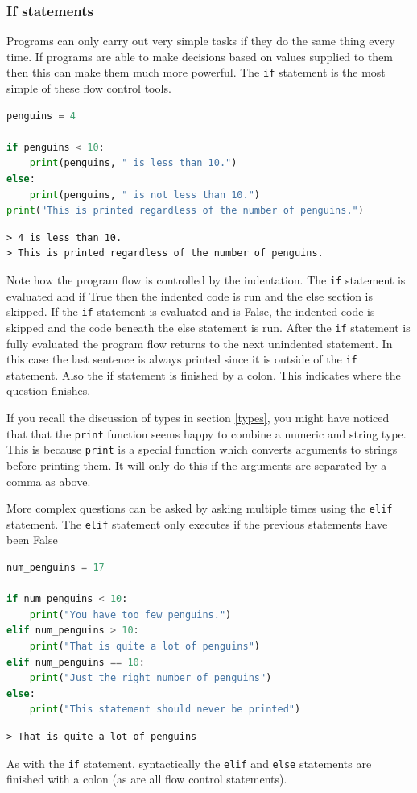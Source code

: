 		\subsubsection{If statements}
		Programs can only carry out very simple tasks if they do the same thing every time. If programs are able to make decisions based on values supplied to them then this can make them much more powerful. The \texttt{if} statement is the most simple of these flow control tools.
		
		\begin{lstlisting}[language=Python]
penguins = 4

if penguins < 10:
	print(penguins, " is less than 10.")
else:
	print(penguins, " is not less than 10.")
print("This is printed regardless of the number of penguins.")\end{lstlisting}
		\begin{verbatim}
> 4 is less than 10.
> This is printed regardless of the number of penguins.\end{verbatim}	
		Note how the program flow is controlled by the indentation. The \texttt{if} statement  is evaluated and if True then the indented code is run and the else section is skipped. If the \texttt{if} statement  is evaluated and is False, the indented code is skipped and the code beneath the else statement is run. After the \texttt{if}  statement is fully evaluated the program flow returns to the next unindented statement. In this case the last sentence is always printed since it is outside of the \texttt{if} statement. Also the if statement is finished by a colon. This indicates where the question finishes.
		
		If you recall the discussion of types in section \ref{types}, you might have noticed that that the \texttt{print} function seems happy to combine a numeric and string type. This is because \texttt{print} is a special function which converts arguments to strings before printing them. It will only do this if the arguments are separated by a comma as above.
		
		More complex questions can be asked by asking multiple times using the \texttt{elif} statement. The \texttt{elif} statement only executes if the previous statements have been False
		\begin{lstlisting}[language=Python]
num_penguins = 17

if num_penguins < 10:
	print("You have too few penguins.")
elif num_penguins > 10:
	print("That is quite a lot of penguins")
elif num_penguins == 10:
	print("Just the right number of penguins")
else:
	print("This statement should never be printed")\end{lstlisting}
		\begin{verbatim}> That is quite a lot of penguins\end{verbatim}
As with the \texttt{if} statement, syntactically the \texttt{elif} and \texttt{else} statements are finished with a colon (as are all flow control statements).	

